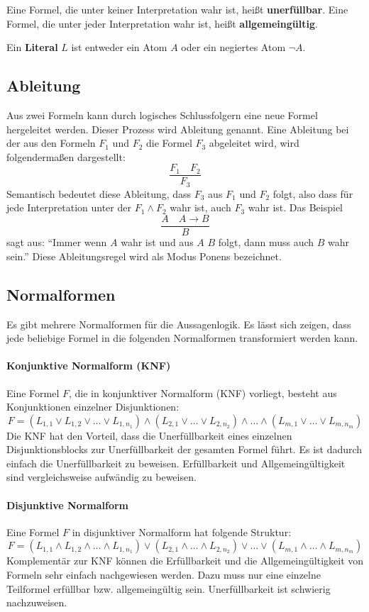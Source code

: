 Eine Formel, die unter keiner Interpretation wahr ist, heißt \textbf{unerfüllbar}. Eine Formel, die unter jeder Interpretation wahr ist, heißt \textbf{allgemeingültig}.

Ein \textbf{Literal} $L$ ist entweder ein Atom $A$ oder ein negiertes Atom $\neg A$. 
		\subsection{Ableitung}
Aus zwei Formeln kann durch logisches Schlussfolgern eine neue Formel hergeleitet werden. Dieser Prozess wird Ableitung genannt. Eine Ableitung bei der aus den Formeln $F_1$ und $F_2$ die Formel $F_3$ abgeleitet wird, wird folgendermaßen dargestellt:
$$\frac{F_1 \quad F_2}{F_3}$$
Semantisch bedeutet diese Ableitung, dass $F_3$ aus $F_1$ und $F_2$ folgt, also dass für jede Interpretation unter der $F_1 \wedge F_2$ wahr ist, auch $F_3$ wahr ist.
Das Beispiel 
$$\frac{A\quad A\to B}{B}$$
sagt aus: "`Immer wenn $A$ wahr ist und aus $A$ $B$ folgt, dann muss auch $B$ wahr sein."' Diese Ableitungsregel wird als Modus Ponens bezeichnet. \cite{Hoffmann2008TI}

\subsection{Normalformen}\label{section:Normalformen}
Es gibt mehrere Normalformen für die Aussagenlogik. Es lässt sich zeigen, dass jede beliebige Formel in die folgenden Normalformen transformiert werden kann.
\paragraph{Konjunktive Normalform (KNF)}
Eine Formel $F$, die in konjunktiver Normalform (KNF) vorliegt, besteht aus Konjunktionen einzelner Disjunktionen:
$$F=(L_{1,1} \vee L_{1,2} \vee \ldots \vee L_{1,n_1}) \wedge
   (L_{2,1} \vee \ldots \vee L_{2,n_2}) \wedge \ldots \wedge
   (L_{m,1} \vee \ldots \vee L_{m,n_m})$$
Die KNF hat den Vorteil, dass die Unerfüllbarkeit eines einzelnen Disjunktionsblocks zur Unerfüllbarkeit der gesamten Formel führt. Es ist dadurch einfach die Unerfüllbarkeit zu beweisen. Erfüllbarkeit und Allgemeingültigkeit sind vergleichsweise aufwändig zu beweisen.
\paragraph{Disjunktive Normalform}
Eine Formel $F$ in disjunktiver Normalform hat folgende Struktur:
$$F=(L_{1,1} \wedge L_{1,2} \wedge \ldots \wedge L_{1,n_1}) \vee
(L_{2,1} \wedge \ldots \wedge L_{2,n_2}) \vee \ldots \vee
(L_{m,1} \wedge \ldots \wedge L_{m,n_m})$$
Komplementär zur KNF können die Erfüllbarkeit und die Allgemeingültigkeit von Formeln sehr einfach nachgewiesen werden. Dazu muss nur eine einzelne Teilformel erfüllbar bzw. allgemeingültig sein. Unerfüllbarkeit ist schwierig nachzuweisen.

